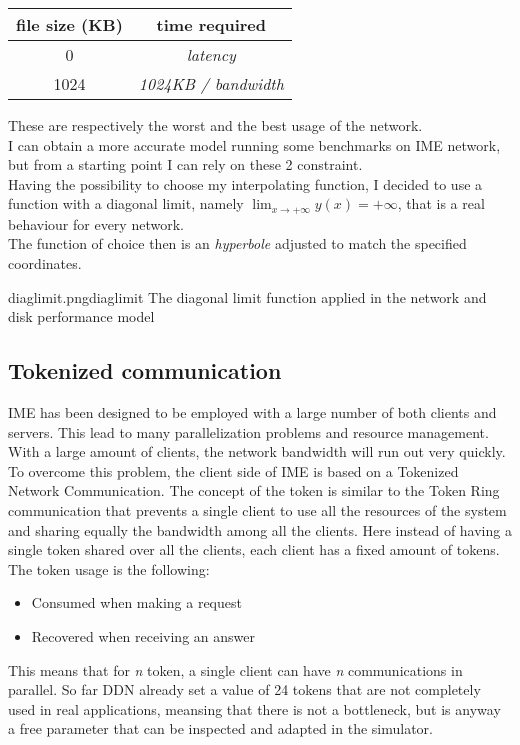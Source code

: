 \vspace{0.5cm}
\begin{tabular}{c | c}
    file size (KB) & time required \\ \hline
    0 & \textit{latency} \\ \hline
    1024 & \textit{1024KB / bandwidth}
\end{tabular}
\vspace{0.5cm}

These are respectively the worst and the best usage of the network. \\
I can obtain a more accurate model running some benchmarks on IME network, but
from a starting point I can rely on these 2 constraint. \\
Having the possibility to choose my interpolating function, I decided to use a
function with a diagonal limit, namely $\lim_{x \to +\infty} y(x) = +\infty$,
that is a real behaviour for every network. \\
The function of choice then is an \textit{hyperbole} adjusted to match the
specified coordinates. \\
\begin{myimage}{diaglimit.png}{diaglimit}
    The diagonal limit function applied in the network and disk performance model
\end{myimage}


\subsection{Tokenized communication}
IME has been designed to be employed with a large number of both clients and
servers. This lead to many parallelization problems and resource management.
With a large amount of clients, the network bandwidth will run out very quickly.
To overcome this problem, the client side of IME is based on a Tokenized Network
Communication. The concept of the token is similar to the Token Ring
communication \cite{token-ring} that prevents a single client to use all the
resources of the system and sharing equally the bandwidth among all the
clients.  Here instead of having a single token shared over all the clients,
each client has a fixed amount of tokens.\\
The token usage is the following:
\begin{itemize}
    \item Consumed when making a request
    \item Recovered when receiving an answer
\end{itemize}
This means that for \textit{n} token, a single client can have \textit{n}
communications in parallel.  So far DDN already set a value of 24 tokens that
are not completely used in real applications, meansing that there is not a
bottleneck, but is anyway a free parameter that can be inspected and adapted in
the simulator.


